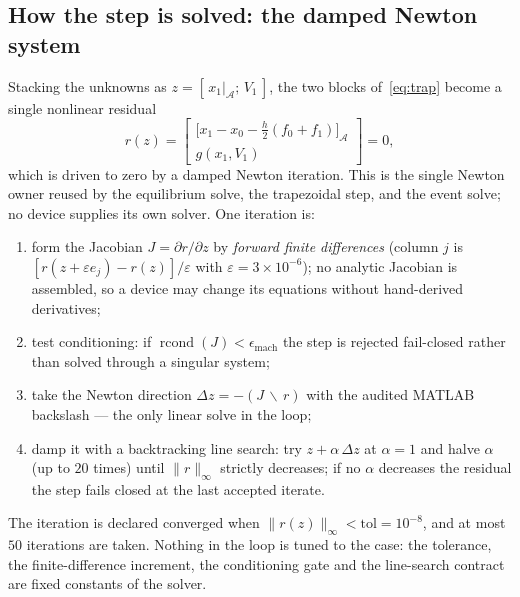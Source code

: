 \documentclass[12pt,a4paper]{article}
\begin{document}
\subsection{How the step is solved: the damped Newton system}\label{sec:ts-newton}
Stacking the unknowns as $z=[\,x_1|_{\mathcal{A}};\,V_1\,]$, the two blocks
of~\eqref{eq:trap} become a single nonlinear residual
\begin{equation}
  r(z)=\begin{bmatrix} \bigl[x_1-x_0-\tfrac{h}{2}(f_0+f_1)\bigr]_{\mathcal{A}}\\[2pt]
       g(x_1,V_1)\end{bmatrix}=0,
  \label{eq:resid}
\end{equation}
which is driven to zero by a damped Newton iteration. This is the single Newton
owner reused by the equilibrium solve, the trapezoidal step, and the event
solve; no device supplies its own solver. One iteration is:
\begin{enumerate}\itemsep2pt
  \item form the Jacobian $J=\partial r/\partial z$ by \emph{forward finite
        differences} (column $j$ is $[r(z+\varepsilon e_j)-r(z)]/\varepsilon$
        with $\varepsilon=3\times10^{-6}$); no analytic Jacobian is assembled,
        so a device may change its equations without hand-derived derivatives;
  \item test conditioning: if $\operatorname{rcond}(J)<\epsilon_{\mathrm{mach}}$
        the step is rejected fail-closed rather than solved through a singular
        system;
  \item take the Newton direction $\Delta z=-(J\,\backslash\,r)$ with the
        audited MATLAB backslash --- the only linear solve in the loop;
  \item damp it with a backtracking line search: try $z+\alpha\,\Delta z$ at
        $\alpha=1$ and halve $\alpha$ (up to $20$ times) until
        $\lVert r\rVert_\infty$ strictly decreases; if no $\alpha$ decreases the
        residual the step fails closed at the last accepted iterate.
\end{enumerate}
The iteration is declared converged when
$\lVert r(z)\rVert_\infty<\mathrm{tol}=10^{-8}$, and at most $50$ iterations are
taken. Nothing in the loop is tuned to the case: the tolerance, the
finite-difference increment, the conditioning gate and the line-search contract
are fixed constants of the solver.
\end{document}
